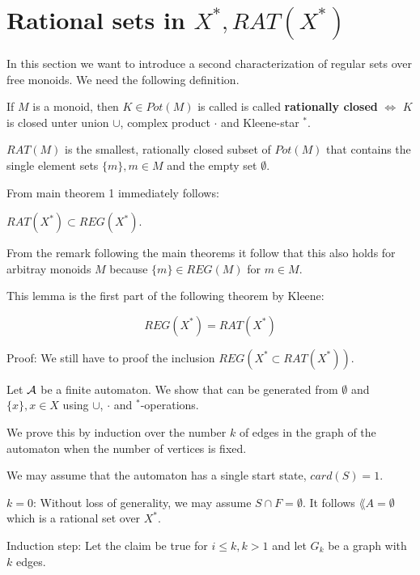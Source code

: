 \section{Rational sets in $X^*, RAT(X^*)$}

In this section we want to introduce a second characterization of regular sets
over free monoids. We need the following definition.

\begin{definition}
If $M$ is a monoid, then $K \in Pot(M)$ is called is called {\bf rationally
closed} $\Leftrightarrow$ $K$ is closed unter union $\cup$, complex product $\cdot$ and Kleene-star $^*$.
\end{definition}

\begin{definition}
$RAT(M)$ is the smallest, rationally closed subset of $Pot(M)$ that contains the
single element sets $\{m\}, m \in M$ and the empty set $\emptyset$.
\end{definition}

From main theorem 1 immediately follows:

\begin{lemma}
$RAT(X^*) \subset REG(X^*)$.
\end{lemma}

From the remark following the main theorems it follow that this also holds for
arbitray monoids $M$ because $\{m\} \in REG(M)$ for $m \in M$.

This lemma is the first part of the following theorem by Kleene:

\begin{theorem}[Kleene]
\[ REG(X^*) = RAT(X^*) \]
\end{theorem}

Proof: We still have to proof the inclusion $REG(X^* \subset RAT(X^*))$.

Let $\mbox{$\mathcal{A}$}$ be a finite automaton. We show that  can be generated
from $\emptyset$ and $\{x\}, x \in X$	using $\cup$, $\cdot$ and $^*$-operations.

We prove this by induction over the number $k$ of edges in the graph of the
automaton when the number of vertices is fixed.

We may assume that the automaton has a single start state, $card(S) = 1$.

$k = 0$: Without loss of generality, we may assume $S \cap F = \emptyset$. It
follows $\lang{A} = \emptyset$ which is a rational set over $X^*$.

Induction step: Let the claim be true for $i \leq k, k > 1$ and let $G_k$ be a
graph with $k$ edges.

